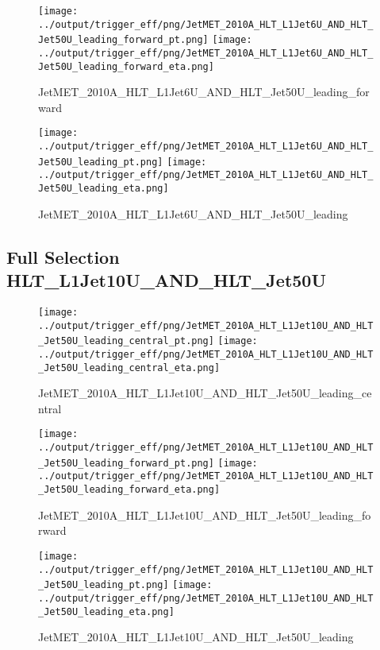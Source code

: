 \documentclass[11pt]{article}
\begin{document}
\begin{figure}[ht]
\centering
\texttt{[image: ../output/trigger\_eff/png/JetMET\_2010A\_HLT\_L1Jet6U\_AND\_HLT\_Jet50U\_leading\_forward\_pt.png]}
\texttt{[image: ../output/trigger\_eff/png/JetMET\_2010A\_HLT\_L1Jet6U\_AND\_HLT\_Jet50U\_leading\_forward\_eta.png]}
\caption{JetMET\_2010A\_HLT\_L1Jet6U\_AND\_HLT\_Jet50U\_leading\_forward}
\label{fig:jetmet_L1Jet6U_AND_HLT_Jet50U_leading_forward}
\end{figure}

\begin{figure}[ht]
\centering
\texttt{[image: ../output/trigger\_eff/png/JetMET\_2010A\_HLT\_L1Jet6U\_AND\_HLT\_Jet50U\_leading\_pt.png]}
\texttt{[image: ../output/trigger\_eff/png/JetMET\_2010A\_HLT\_L1Jet6U\_AND\_HLT\_Jet50U\_leading\_eta.png]}
\caption{JetMET\_2010A\_HLT\_L1Jet6U\_AND\_HLT\_Jet50U\_leading}
\label{fig:jetmet_L1Jet6U_AND_HLT_Jet50U_leading}
\end{figure}


\newpage
\subsection{Full Selection HLT\_L1Jet10U\_AND\_HLT\_Jet50U}
\begin{figure}[ht]
\centering
\texttt{[image: ../output/trigger\_eff/png/JetMET\_2010A\_HLT\_L1Jet10U\_AND\_HLT\_Jet50U\_leading\_central\_pt.png]}
\texttt{[image: ../output/trigger\_eff/png/JetMET\_2010A\_HLT\_L1Jet10U\_AND\_HLT\_Jet50U\_leading\_central\_eta.png]}
\caption{JetMET\_2010A\_HLT\_L1Jet10U\_AND\_HLT\_Jet50U\_leading\_central}
\label{fig:jetmet_L1Jet10U_AND_HLT_Jet50U_leading_central}
\end{figure}

\begin{figure}[ht]
\centering
\texttt{[image: ../output/trigger\_eff/png/JetMET\_2010A\_HLT\_L1Jet10U\_AND\_HLT\_Jet50U\_leading\_forward\_pt.png]}
\texttt{[image: ../output/trigger\_eff/png/JetMET\_2010A\_HLT\_L1Jet10U\_AND\_HLT\_Jet50U\_leading\_forward\_eta.png]}
\caption{JetMET\_2010A\_HLT\_L1Jet10U\_AND\_HLT\_Jet50U\_leading\_forward}
\label{fig:jetmet_L1Jet10U_AND_HLT_Jet50U_leading_forward}
\end{figure}

\begin{figure}[ht]
\centering
\texttt{[image: ../output/trigger\_eff/png/JetMET\_2010A\_HLT\_L1Jet10U\_AND\_HLT\_Jet50U\_leading\_pt.png]}
\texttt{[image: ../output/trigger\_eff/png/JetMET\_2010A\_HLT\_L1Jet10U\_AND\_HLT\_Jet50U\_leading\_eta.png]}
\caption{JetMET\_2010A\_HLT\_L1Jet10U\_AND\_HLT\_Jet50U\_leading}
\label{fig:jetmet_L1Jet10U_AND_HLT_Jet50U_leading}
\end{figure}
\end{document}
